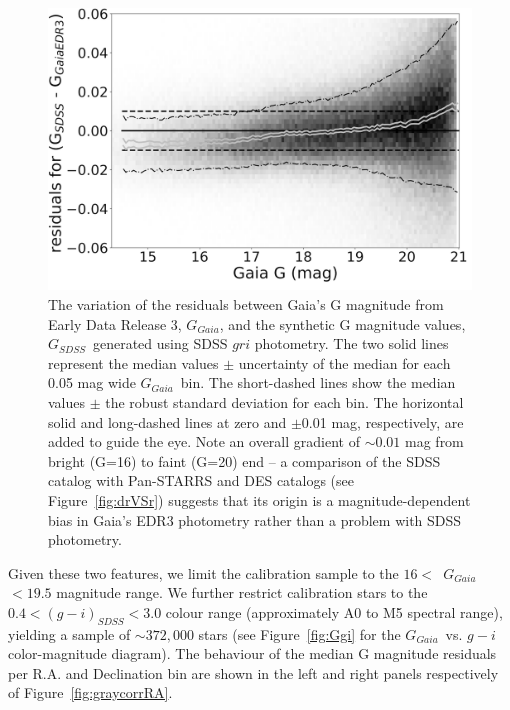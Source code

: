 \documentclass[fleqn,usenatbib]{mnras}
\newcommand{\GG}{\hbox{$G_{Gaia}$}}
\newcommand{\GS}{\hbox{$G_{SDSS}$}}
\begin{document}
\begin{figure}
    \centering\includegraphics[width=0.95\columnwidth]{figures/GmagCorrectionTest_Gmag_Hess_lr.png} 
\caption{The variation of the residuals between Gaia's G magnitude from Early Data Release 3, \GG,
and the synthetic G magnitude values, \GS\ generated using SDSS $gri$ photometry. The two solid 
lines represent the median values $\pm$ uncertainty of the median for each
0.05 mag wide \GG\ bin. The short-dashed lines show the median values $\pm$ 
the robust standard deviation for each bin. The horizontal solid and long-dashed 
lines at zero and $\pm$0.01 mag, respectively, are added to guide the eye.
Note an overall gradient of $\sim0.01$ mag from bright (G=16) to faint (G=20) 
end -- a comparison of the SDSS catalog with Pan-STARRS and DES catalogs (see 
Figure~\ref{fig:drVSr}) suggests that its origin is a magnitude-dependent bias in
 Gaia's EDR3 photometry rather than a problem with SDSS photometry.}
\label{fig:gaiaJump}
\end{figure}


Given these two features, we limit the calibration sample to the $16<$~\GG~$<19.5$
magnitude range. We further restrict calibration stars to the $0.4 < (g-i)_{SDSS} < 3.0$ colour 
range (approximately A0 to M5 spectral range), yielding a sample of $\sim372,000$ stars
(see Figure~\ref{fig:Ggi} for the \GG\ vs. $g-i$ color-magnitude diagram).
The behaviour of the median G magnitude residuals per R.A. and Declination bin are shown in 
the left and right panels respectively of Figure~\ref{fig:graycorrRA}.
\end{document}
